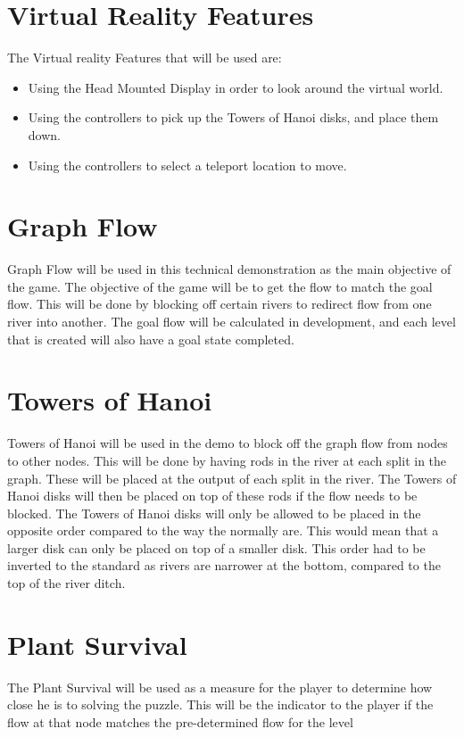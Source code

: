 \section{Virtual Reality Features}
The Virtual reality Features that will be used are:
\begin{itemize}
	\item Using the Head Mounted Display in order to look around the virtual world.
	\item Using the controllers to pick up the Towers of Hanoi disks, and place them down.
	\item Using the controllers to select a teleport location to move.
\end{itemize}

\section{Graph Flow}
Graph Flow will be used in this technical demonstration as the main objective of the game. The objective of the game will be to get the flow to match the goal flow. This will be done by blocking off certain rivers to redirect flow from one river into another. The goal flow will be calculated in development, and each level that is created will also have a goal state completed.

\section{Towers of Hanoi}
Towers of Hanoi will be used in the demo to block off the graph flow from nodes to other nodes. This will be done by having rods in the river at each split in the graph. These will be placed at the output of each split in the river. The Towers of Hanoi disks will then be placed on top of these rods if the flow needs to be blocked. The Towers of Hanoi disks will only be allowed to be placed in the opposite order compared to the way the normally are. This would mean that a larger disk can only be placed on top of a smaller disk. This order had to be inverted to the standard as rivers are narrower at the bottom, compared to the top of the river ditch. 

\section{Plant Survival}
The Plant Survival will be used as a measure for the player to determine how close he is to solving the puzzle. This will be the indicator to the player if the flow at that node matches the pre-determined flow for the level